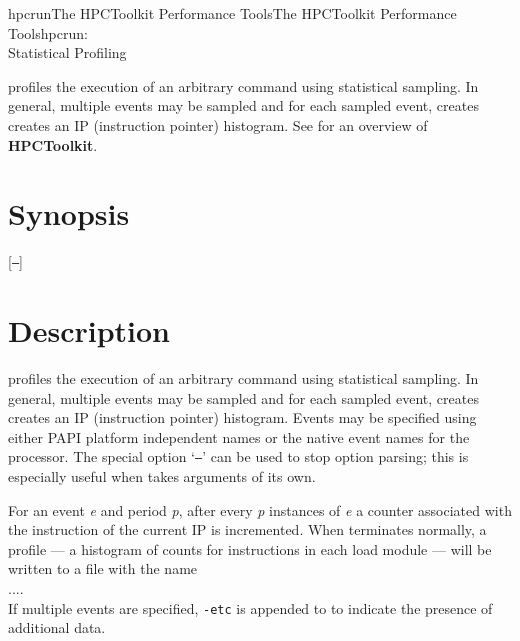 \documentclass[english]{article}
\begin{document}
\begin{Name}{1}{hpcrun}{The HPCToolkit Performance Tools}{The HPCToolkit Performance Tools}{hpcrun:\\ Statistical Profiling}

 profiles the execution of an arbitrary command using statistical
sampling.
In general, multiple events may be sampled and for each sampled event,  creates creates an IP (instruction pointer) histogram.
See  for an overview of \textbf{HPCToolkit}.

\end{Name}

\section{Synopsis}

  [\texttt{--}]  

 

\section{Description}

 profiles the execution of an arbitrary command  using statistical sampling.
In general, multiple events may be sampled and for each sampled event,  creates creates an IP (instruction pointer) histogram.
Events may be specified using either PAPI platform independent names or the native event names for the processor.
The special option `\texttt{--}' can be used to stop  option parsing; this is especially useful when  takes arguments of its own.

For an event \emph{e} and period \emph{p}, after every \emph{p} instances of \emph{e} a counter associated with the instruction of the current IP is incremented.
When  terminates normally, a profile --- a histogram of counts for instructions in each load module --- will be written to a file with the name\\
\SP\SP\SP {}....\\
If multiple events are specified, \texttt{-etc} is appended to  to indicate the presence of additional data.
\end{document}
